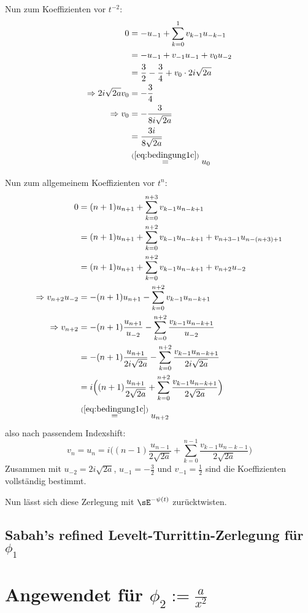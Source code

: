 Nun zum Koeffizienten vor $t^{-2}$:
\begin{align*}
0&= -u_{-1} + \sum_{k=0}^{1} v_{k-1}u_{-k-1}
\\&= -u_{-1} + v_{-1}u_{-1} + v_{0}u_{-2}
\\&= \frac{3}{2} - \frac{3}{4} + v_{0}\cdot2i\sqrt{2a}
\\\Rightarrow 2i\sqrt{2a} v_0 &= -\frac{3}{4}
\\\Rightarrow v_0 &= -\frac{3}{8i\sqrt{2a}}
\\&= \frac{3i}{8\sqrt{2a}}
\\&\overset{(\ref{eq:bedingung1c})}{=}u_0
\end{align*}

Nun zum allgemeinem Koeffizienten vor $t^{n}$:
\begin{align*}
0&= (n+1)u_{n+1} + \sum_{k=0}^{n+3} v_{k-1}u_{n-k+1}
\\&= (n+1)u_{n+1} + \sum_{k=0}^{n+2} v_{k-1}u_{n-k+1} + v_{n+3-1}u_{n-(n+3)+1}
\\&= (n+1)u_{n+1} + \sum_{k=0}^{n+2} v_{k-1}u_{n-k+1} + v_{n+2}u_{-2}
\\\Rightarrow v_{n+2}u_{-2}&=-(n+1)u_{n+1} - \sum_{k=0}^{n+2} v_{k-1}u_{n-k+1}
\\\Rightarrow v_{n+2} &= 
  -(n+1)\frac{u_{n+1}}{u_{-2}}-\sum_{k=0}^{n+2} \frac{v_{k-1}u_{n-k+1}}{u_{-2}}
\\&= -(n+1)\frac{u_{n+1}}{2i\sqrt{2a}} 
  - \sum_{k=0}^{n+2} \frac{v_{k-1}u_{n-k+1}}{2i\sqrt{2a}}
\\&= i\Big((n+1)\frac{u_{n+1}}{2\sqrt{2a}} 
  + \sum_{k=0}^{n+2} \frac{v_{k-1}u_{n-k+1}}{2\sqrt{2a}}\Big)
\\&\overset{(\ref{eq:bedingung1c})}{=}u_{n+2}
\end{align*}
also nach passendem Indexshift:
\begin{equation}
v_n = u_n = 
i\Big((n-1)\frac{u_{n-1}}{2\sqrt{2a}} 
  + \sum_{k=0}^{n-1} \frac{v_{k-1}u_{n-k-1}}{2\sqrt{2a}}\Big)
\end{equation}
Zusammen mit $u_{-2}=2i\sqrt{2a}$, $u_{-1}=-\frac{3}{2}$ und
$v_{-1}=\frac{1}{2}$ sind die Koeffizienten vollständig bestimmt.

\begin{comment}
$\cdots$
\end{comment}

Nun lässt sich diese Zerlegung mit $\sE^{-\psi(t)}$ zurücktwisten.

\subsection{Sabah's refined Levelt-Turrittin-Zerlegung für $\phi_1$}

\section{Angewendet für $\phi_2:=\frac{a}{x^2}$}

